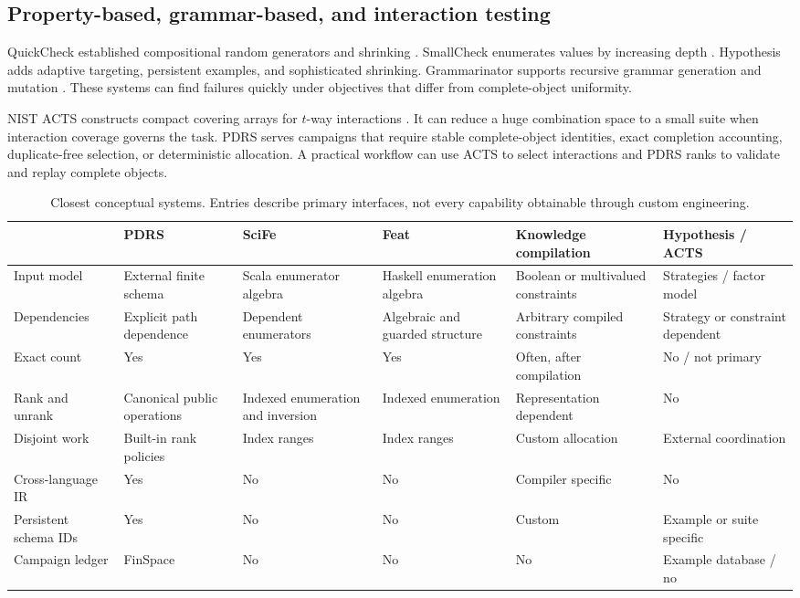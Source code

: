 \documentclass[10pt]{article}
\begin{document}
\subsection{Property-based, grammar-based, and interaction testing}
QuickCheck established compositional random generators and shrinking \cite{quickcheck2000}. SmallCheck enumerates values by increasing depth \cite{smallcheck2008}. Hypothesis adds adaptive targeting, persistent examples, and sophisticated shrinking. Grammarinator supports recursive grammar generation and mutation \cite{grammarinator2018}. These systems can find failures quickly under objectives that differ from complete-object uniformity.

NIST ACTS constructs compact covering arrays for \(t\)-way interactions \cite{acts2010}. It can reduce a huge combination space to a small suite when interaction coverage governs the task. PDRS serves campaigns that require stable complete-object identities, exact completion accounting, duplicate-free selection, or deterministic allocation. A practical workflow can use ACTS to select interactions and PDRS ranks to validate and replay complete objects.

\begin{table}[t]
\centering
\small
\caption{Closest conceptual systems. Entries describe primary interfaces, not every capability obtainable through custom engineering.}
\begin{tabularx}{\textwidth}{lXXXXX}
\toprule
 & PDRS & SciFe & Feat & Knowledge compilation & Hypothesis / ACTS \\
\midrule
Input model & External finite schema & Scala enumerator algebra & Haskell enumeration algebra & Boolean or multivalued constraints & Strategies / factor model \\
Dependencies & Explicit path dependence & Dependent enumerators & Algebraic and guarded structure & Arbitrary compiled constraints & Strategy or constraint dependent \\
Exact count & Yes & Yes & Yes & Often, after compilation & No / not primary \\
Rank and unrank & Canonical public operations & Indexed enumeration and inversion & Indexed enumeration & Representation dependent & No \\
Disjoint work & Built-in rank policies & Index ranges & Index ranges & Custom allocation & External coordination \\
Cross-language IR & Yes & No & No & Compiler specific & No \\
Persistent schema IDs & Yes & No & No & Custom & Example or suite specific \\
Campaign ledger & FinSpace & No & No & No & Example database / no \\
\bottomrule
\end{tabularx}
\end{table}
\end{document}
